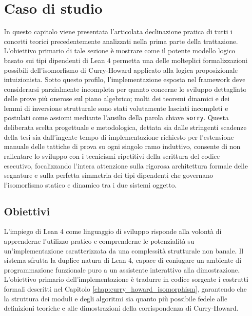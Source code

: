 \chapter{Caso di studio}
\label{chap:cases_of_study}

In questo capitolo viene presentata l'articolata declinazione pratica di tutti i concetti teorici precedentemente analizzati nella prima parte della trattazione. 
L'obiettivo primario di tale sezione è mostrare come il potente modello logico basato sui tipi dipendenti di Lean 4 permetta una delle molteplici formalizzazioni 
possibili dell'isomorfismo di Curry-Howard applicato alla logica proposizionale intuizionista. Sotto questo profilo, l'implementazione esposta nel framework deve 
considerarsi parzialmente incompleta per quanto concerne lo sviluppo dettagliato delle prove più onerose sul piano algebrico; molti dei teoremi dinamici e dei lemmi 
di inversione strutturale sono stati volutamente lasciati incompleti e postulati come assiomi mediante l'ausilio della parola chiave \texttt{sorry}. Questa deliberata 
scelta progettuale e metodologica, dettata sia dalle stringenti scadenze della tesi sia dall'ingente tempo di implementazione richiesto per l'estensione manuale delle 
tattiche di prova su ogni singolo ramo induttivo, consente di non rallentare lo sviluppo con i tecnicismi ripetitivi della scrittura del codice esecutivo, focalizzando 
l'intera attenzione sulla rigorosa architettura formale delle segnature e sulla perfetta simmetria dei tipi dipendenti che governano l'isomorfismo statico e dinamico 
tra i due sistemi oggetto.

\section{Obiettivi}
L'impiego di Lean 4 come linguaggio di sviluppo risponde alla volontà di apprenderne l'utilizzo pratico e comprenderne le potenzialità su un'implementazione 
caratterizzata da una complessità strutturale non banale. Il sistema sfrutta la duplice natura di Lean 4, capace di coniugare un ambiente di programmazione 
funzionale puro a un assistente interattivo alla dimostrazione. L'obiettivo primario dell'implementazione è tradurre in codice sorgente i costrutti formali 
descritti nel Capitolo \ref{chap:curry_howard_isomorphism}, garantendo che la struttura dei moduli e degli algoritmi sia quanto più possibile fedele alle 
definizioni teoriche e alle dimostrazioni della corrispondenza di Curry-Howard.

